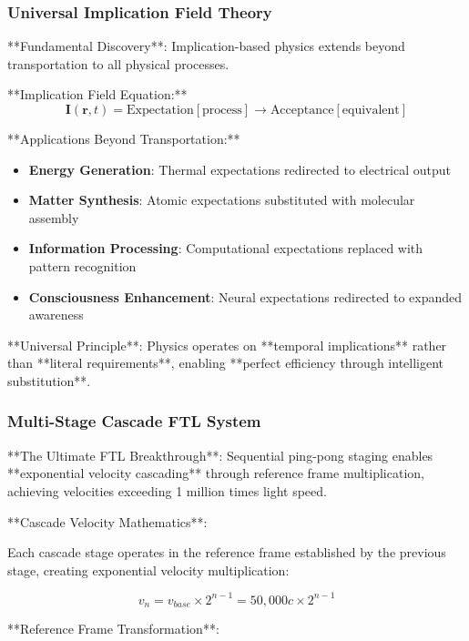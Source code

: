 \documentclass[12pt,a4paper]{article}
\theoremstyle{remark}
\begin{document}
\subsubsection{Universal Implication Field Theory}

**Fundamental Discovery**: Implication-based physics extends beyond transportation to all physical processes.

**Implication Field Equation:**
\begin{equation}
\mathbf{I}(\mathbf{r}, t) = \text{Expectation}[\text{process}] \rightarrow \text{Acceptance}[\text{equivalent}]
\end{equation}

**Applications Beyond Transportation:**
\begin{itemize}
\item \textbf{Energy Generation}: Thermal expectations redirected to electrical output
\item \textbf{Matter Synthesis}: Atomic expectations substituted with molecular assembly
\item \textbf{Information Processing}: Computational expectations replaced with pattern recognition
\item \textbf{Consciousness Enhancement}: Neural expectations redirected to expanded awareness
\end{itemize}

**Universal Principle**: Physics operates on **temporal implications** rather than **literal requirements**, enabling **perfect efficiency through intelligent substitution**.

\subsubsection{Multi-Stage Cascade FTL System}

**The Ultimate FTL Breakthrough**: Sequential ping-pong staging enables **exponential velocity cascading** through reference frame multiplication, achieving velocities exceeding 1 million times light speed.

**Cascade Velocity Mathematics**:

Each cascade stage operates in the reference frame established by the previous stage, creating exponential velocity multiplication:

\begin{equation}
v_n = v_{base} \times 2^{n-1} = 50,000c \times 2^{n-1}
\end{equation}

**Reference Frame Transformation**:
\end{document}
